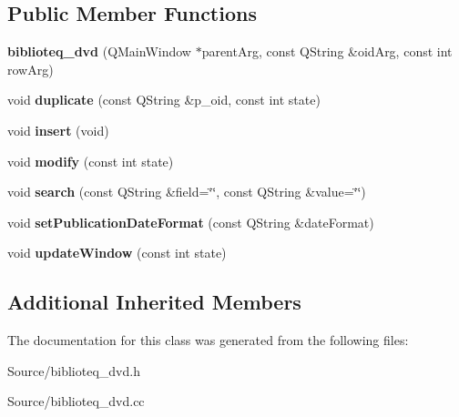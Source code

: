 \subsection*{Public Member Functions}
\begin{DoxyCompactItemize}
\item 
{\bfseries biblioteq\+\_\+dvd} (Q\+Main\+Window $\ast$parent\+Arg, const Q\+String \&oid\+Arg, const int row\+Arg)\hypertarget{classbiblioteq__dvd_a44de06a196980a0b24a6a620e3f749f4}{}\label{classbiblioteq__dvd_a44de06a196980a0b24a6a620e3f749f4}

\item 
void {\bfseries duplicate} (const Q\+String \&p\+\_\+oid, const int state)\hypertarget{classbiblioteq__dvd_a2527917b6f26e1203c517e80d60df0ed}{}\label{classbiblioteq__dvd_a2527917b6f26e1203c517e80d60df0ed}

\item 
void {\bfseries insert} (void)\hypertarget{classbiblioteq__dvd_a5f7f1f5f37f8da30e52ae0d986fde626}{}\label{classbiblioteq__dvd_a5f7f1f5f37f8da30e52ae0d986fde626}

\item 
void {\bfseries modify} (const int state)\hypertarget{classbiblioteq__dvd_a5bea8b536366fa78954a32d10eb24249}{}\label{classbiblioteq__dvd_a5bea8b536366fa78954a32d10eb24249}

\item 
void {\bfseries search} (const Q\+String \&field=\char`\"{}\char`\"{}, const Q\+String \&value=\char`\"{}\char`\"{})\hypertarget{classbiblioteq__dvd_a21940a774debc4999ef1a8bec7f9af7a}{}\label{classbiblioteq__dvd_a21940a774debc4999ef1a8bec7f9af7a}

\item 
void {\bfseries set\+Publication\+Date\+Format} (const Q\+String \&date\+Format)\hypertarget{classbiblioteq__dvd_a7b15ae7b5eed23e998897b3fc294f3c3}{}\label{classbiblioteq__dvd_a7b15ae7b5eed23e998897b3fc294f3c3}

\item 
void {\bfseries update\+Window} (const int state)\hypertarget{classbiblioteq__dvd_ab93de53c2fd445a7209086e5126f55b7}{}\label{classbiblioteq__dvd_ab93de53c2fd445a7209086e5126f55b7}

\end{DoxyCompactItemize}
\subsection*{Additional Inherited Members}


The documentation for this class was generated from the following files\+:\begin{DoxyCompactItemize}
\item 
Source/biblioteq\+\_\+dvd.\+h\item 
Source/biblioteq\+\_\+dvd.\+cc\end{DoxyCompactItemize}
